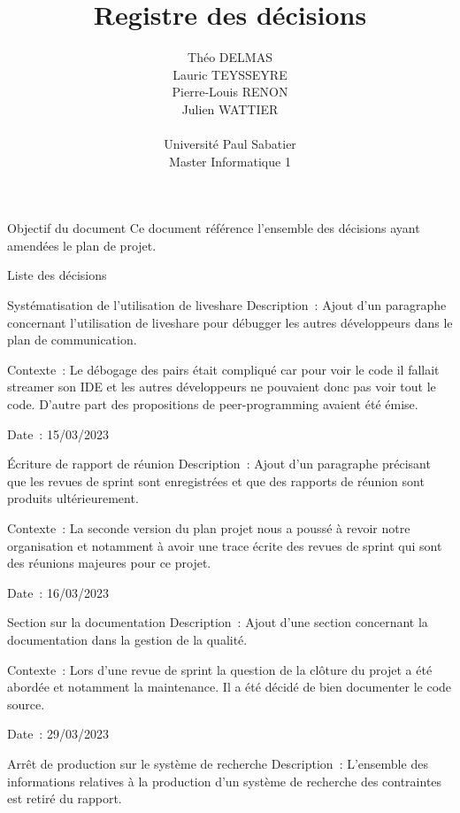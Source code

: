 \documentclass[]{article}
\title{Registre des décisions}
\author{
    Théo DELMAS\\
    Lauric TEYSSEYRE\\
    Pierre-Louis RENON\\
    Julien WATTIER\\
    \\
    Université Paul Sabatier\\
    Master Informatique 1\\
   }
\begin{document}
\maketitle
\newpage
\tableofcontents
\newpage

\begin{section}{Objectif du document}
 Ce document référence l'ensemble des décisions ayant amendées le plan de projet.
\end{section}

{
\setlength{\parindent}{0pt} %
\begin{section}{Liste des décisions}
 \begin{subsection}{Systématisation de l’utilisation de liveshare}
     Description : Ajout d’un paragraphe concernant l’utilisation de liveshare pour débugger les autres développeurs dans le plan de communication.

     Contexte : Le débogage des pairs était compliqué car pour voir le code il fallait streamer son IDE et les autres développeurs ne pouvaient donc pas voir tout le code. D’autre part des propositions de peer-programming avaient été émise.

     Date : 15/03/2023
 \end{subsection}
 \begin{subsection}{Écriture de rapport de réunion}
     Description : Ajout d’un paragraphe précisant que les revues de sprint sont enregistrées et que des rapports de réunion sont produits ultérieurement.

     Contexte : La seconde version du plan projet nous a poussé à revoir notre organisation et notamment à avoir une trace écrite des revues de sprint qui sont des réunions majeures pour ce projet.

     Date : 16/03/2023
 \end{subsection}
 \begin{subsection}{Section sur la documentation}
     Description : Ajout d’une section concernant la documentation dans la gestion de la qualité.

     Contexte : Lors d’une revue de sprint la question de la clôture du projet a été abordée et notamment la maintenance. Il a été décidé de bien documenter le code source.

     Date : 29/03/2023
 \end{subsection}
 \begin{subsection}{Arrêt de production sur le système de recherche}
     Description : L’ensemble des informations relatives à la production d’un système de recherche des contraintes est retiré du rapport.


\end{subsection}
\end{section}}
\end{document}
